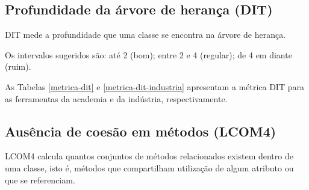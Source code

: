 

\subsection{Profundidade da árvore de herança (DIT)}

DIT mede a profundidade que uma classe se encontra na árvore de herança.

Os intervalos sugeridos são: até 2 (bom); entre 2 e 4 (regular); de 4 em
diante (ruim).

As Tabelas \ref{metrica-dit} e \ref{metrica-dit-industria} apresentam a
métrica DIT para as ferramentas da academia e da indústria, respectivamente.



\subsection{Ausência de coesão em métodos (LCOM4)}

LCOM4 calcula quantos conjuntos de métodos relacionados existem dentro de uma
classe, isto é, métodos que compartilham utilização de algum atributo ou que
se referenciam.

